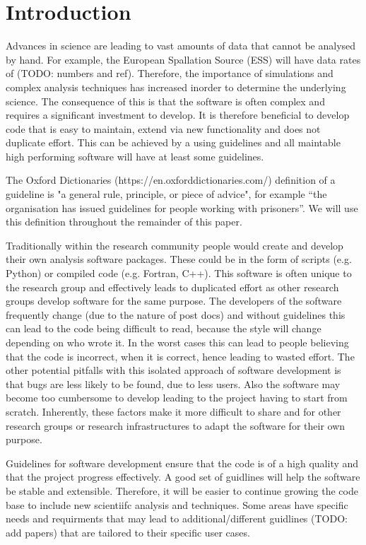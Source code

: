 \documentclass[jnr]{iosart2x}
\begin{document}

\section{Introduction}
\label{Introduction}

Advances in science are leading to vast amounts of data that cannot be analysed by hand.
For example, the European Spallation Source (ESS) will have data rates of (TODO: numbers and ref).
Therefore, the importance of simulations and complex analysis techniques has increased inorder to determine the underlying science.
The consequence of this is that the software is often complex and requires a significant investment to develop.
It is therefore beneficial to develop code that is easy to maintain, extend via new functionality and does not duplicate effort.
This can be achieved by a using guidelines and all maintable high performing software will have at least some guidelines.

The Oxford Dictionaries (https://en.oxforddictionaries.com/) definition of a guideline is "a general rule, principle, or piece of advice", for example “the organisation has issued guidelines for people working with prisoners”.
We will use this definition throughout the remainder of this paper.

Traditionally within the research community people would create and develop their own analysis software packages.
These could be in the form of scripts (e.g. Python) or compiled code (e.g. Fortran, C++).
This software is often unique to the research group and effectively leads to duplicated effort as other research groups develop software for the same purpose.
The developers of the software frequently change (due to the nature of post docs) and without guidelines this can lead to the code being difficult to read, because the style will change depending on who wrote it.
In the worst cases this can lead to people believing that the code is incorrect, when it is correct, hence leading to wasted effort.
The other potential pitfalls with this isolated approach of software development is that bugs are less likely to be found, due to less users.
Also the software may become too cumbersome to develop leading to the project having to start from scratch.
Inherently, these factors make it more difficult to share and for other research groups or research infrastructures to adapt the software for their own purpose.

Guidelines for software development ensure that the code is of a high quality and that the project progress effectively.
A good set of guidlines will help the software be stable and extensible.
Therefore, it will be easier to continue growing the code base to include new scientiifc analysis and techniques.
Some areas have specific needs and requirments that may lead to additional/different guidlines \cite{} (TODO: add papers) that are tailored to their specific user cases.
\end{document}
